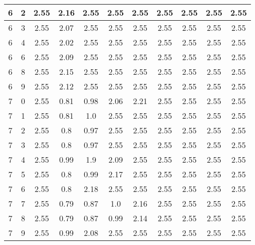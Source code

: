 \begin{longtable}{|c|c||c||c|c|c|c||c|c|c|c|}
	6 & 2 & 2.55 & 2.16 & 2.55 & 2.55 & 2.55 & 2.55 & 2.55 & 2.55 & 2.55 \\ \hline
	6 & 3 & 2.55 & 2.07 & 2.55 & 2.55 & 2.55 & 2.55 & 2.55 & 2.55 & 2.55 \\ \hline
	6 & 4 & 2.55 & 2.02 & 2.55 & 2.55 & 2.55 & 2.55 & 2.55 & 2.55 & 2.55 \\ \hline
	6 & 6 & 2.55 & 2.09 & 2.55 & 2.55 & 2.55 & 2.55 & 2.55 & 2.55 & 2.55 \\ \hline
	6 & 8 & 2.55 & 2.15 & 2.55 & 2.55 & 2.55 & 2.55 & 2.55 & 2.55 & 2.55 \\ \hline
	6 & 9 & 2.55 & 2.12 & 2.55 & 2.55 & 2.55 & 2.55 & 2.55 & 2.55 & 2.55 \\ \hline
	7 & 0 & 2.55 & 0.81 & 0.98 & 2.06 & 2.21 & 2.55 & 2.55 & 2.55 & 2.55 \\ \hline
	7 & 1 & 2.55 & 0.81 & 1.0 & 2.55 & 2.55 & 2.55 & 2.55 & 2.55 & 2.55 \\ \hline
	7 & 2 & 2.55 & 0.8 & 0.97 & 2.55 & 2.55 & 2.55 & 2.55 & 2.55 & 2.55 \\ \hline
	7 & 3 & 2.55 & 0.8 & 0.97 & 2.55 & 2.55 & 2.55 & 2.55 & 2.55 & 2.55 \\ \hline
	7 & 4 & 2.55 & 0.99 & 1.9 & 2.09 & 2.55 & 2.55 & 2.55 & 2.55 & 2.55 \\ \hline
	7 & 5 & 2.55 & 0.8 & 0.99 & 2.17 & 2.55 & 2.55 & 2.55 & 2.55 & 2.55 \\ \hline
	7 & 6 & 2.55 & 0.8 & 2.18 & 2.55 & 2.55 & 2.55 & 2.55 & 2.55 & 2.55 \\ \hline
	7 & 7 & 2.55 & 0.79 & 0.87 & 1.0 & 2.16 & 2.55 & 2.55 & 2.55 & 2.55 \\ \hline
	7 & 8 & 2.55 & 0.79 & 0.87 & 0.99 & 2.14 & 2.55 & 2.55 & 2.55 & 2.55 \\ \hline
	7 & 9 & 2.55 & 0.99 & 2.08 & 2.55 & 2.55 & 2.55 & 2.55 & 2.55 & 2.55 \\ \hline
\end{longtable}
\clearpage{}
